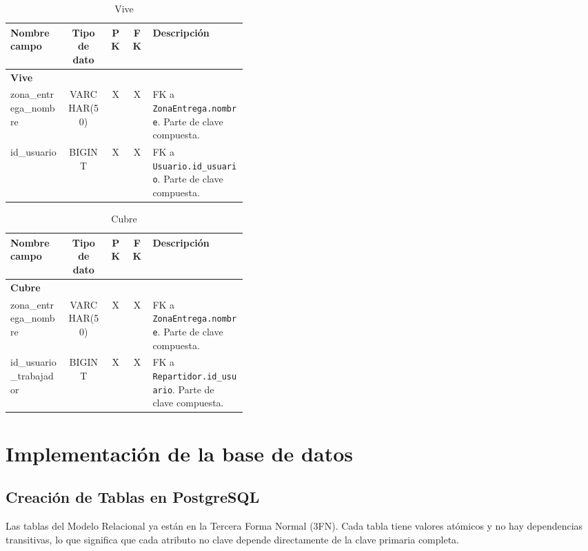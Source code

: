 \documentclass[12pt,a4paper]{article}
\begin{document}
\begin{table}[h!]
\centering
\begin{tabular}{|l|c|c|c|p{0.4\linewidth}|}
\hline
\textbf{Nombre campo}      & \textbf{Tipo de dato} & \textbf{PK} & \textbf{FK} & \textbf{Descripción} \\
\hline
\multicolumn{5}{|l|}{\textbf{Vive}} \\
\hline
zona\_entrega\_nombre       & VARCHAR(50)           & X           & X           & FK a \texttt{ZonaEntrega.nombre}. Parte de clave compuesta. \\
id\_usuario                 & BIGINT                & X           & X           & FK a \texttt{Usuario.id\_usuario}. Parte de clave compuesta. \\
\hline
\end{tabular}
\caption{Vive}
\label{table:vive}
\end{table}


\begin{table}[h!]
\centering
\begin{tabular}{|l|c|c|c|p{0.4\linewidth}|}
\hline
\textbf{Nombre campo}             & \textbf{Tipo de dato} & \textbf{PK} & \textbf{FK} & \textbf{Descripción} \\
\hline
\multicolumn{5}{|l|}{\textbf{Cubre}} \\
\hline
zona\_entrega\_nombre              & VARCHAR(50)           & X           & X           & FK a \texttt{ZonaEntrega.nombre}. Parte de clave compuesta. \\
id\_usuario\_trabajador            & BIGINT                & X           & X           & FK a \texttt{Repartidor.id\_usuario}. Parte de clave compuesta. \\
\hline
\end{tabular}
\caption{Cubre}
\label{table:cubre}
\end{table}

\clearpage

\section{Implementación de la base de datos}
\subsection{Creación de Tablas en PostgreSQL}
Las tablas del Modelo Relacional ya están en la Tercera Forma Normal (3FN). Cada tabla tiene valores atómicos y no hay dependencias transitivas, lo que significa que cada atributo no clave depende directamente de la clave primaria completa.
\end{document}
